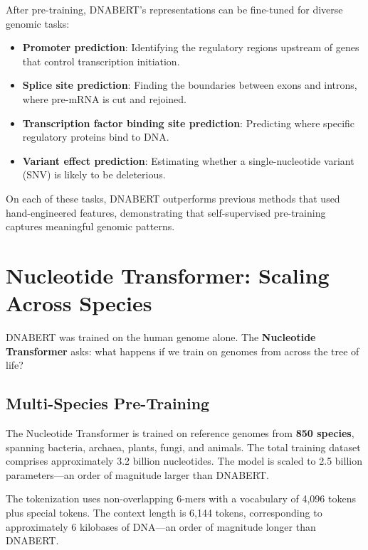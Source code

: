 After pre-training, DNABERT's representations can be fine-tuned for diverse genomic tasks:

\begin{itemize}[leftmargin=1.5em]
  \item \textbf{Promoter prediction}: Identifying the regulatory regions upstream of genes that control transcription initiation.
  \item \textbf{Splice site prediction}: Finding the boundaries between exons and introns, where pre-mRNA is cut and rejoined.
  \item \textbf{Transcription factor binding site prediction}: Predicting where specific regulatory proteins bind to DNA.
  \item \textbf{Variant effect prediction}: Estimating whether a single-nucleotide variant (SNV) is likely to be deleterious.
\end{itemize}

On each of these tasks, DNABERT outperforms previous methods that used hand-engineered features, demonstrating that self-supervised pre-training captures meaningful genomic patterns.

\section{Nucleotide Transformer: Scaling Across Species}
\label{sec:nucleotide-transformer}

DNABERT was trained on the human genome alone. The \textbf{Nucleotide Transformer} \citep{dalla2023nucleotide} asks: what happens if we train on genomes from across the tree of life?

\subsection{Multi-Species Pre-Training}

The Nucleotide Transformer is trained on reference genomes from \textbf{850 species}, spanning bacteria, archaea, plants, fungi, and animals. The total training dataset comprises approximately 3.2 billion nucleotides. The model is scaled to 2.5 billion parameters---an order of magnitude larger than DNABERT.

The tokenization uses non-overlapping 6-mers with a vocabulary of 4,096 tokens plus special tokens. The context length is 6,144 tokens, corresponding to approximately 6 kilobases of DNA---an order of magnitude longer than DNABERT.

